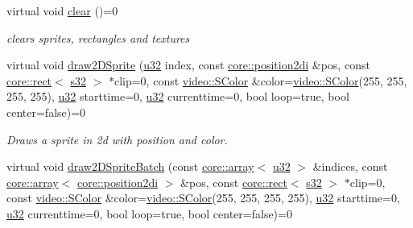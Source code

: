 \begin{DoxyCompactItemize}
virtual void \hyperlink{classirr_1_1gui_1_1IGUISpriteBank_a2305053e90c03ff274b637be23a5dd2a}{clear} ()=0
\begin{DoxyCompactList}\small\item\em clears sprites, rectangles and textures \end{DoxyCompactList}\item 
\mbox{\label{classirr_1_1gui_1_1IGUISpriteBank_aec335112ba4347aa50c5082e26fe2e9a}} 
virtual void \hyperlink{classirr_1_1gui_1_1IGUISpriteBank_aec335112ba4347aa50c5082e26fe2e9a}{draw2\+D\+Sprite} (\hyperlink{namespaceirr_a0416a53257075833e7002efd0a18e804}{u32} index, const \hyperlink{namespaceirr_1_1core_ace0f1379db5f9f5660456ec57ab78202}{core\+::position2di} \&pos, const \hyperlink{classirr_1_1core_1_1rect}{core\+::rect}$<$ \hyperlink{namespaceirr_ac66849b7a6ed16e30ebede579f9b47c6}{s32} $>$ $\ast$clip=0, const \hyperlink{classirr_1_1video_1_1SColor}{video\+::\+S\+Color} \&color=\hyperlink{classirr_1_1video_1_1SColor}{video\+::\+S\+Color}(255, 255, 255, 255), \hyperlink{namespaceirr_a0416a53257075833e7002efd0a18e804}{u32} starttime=0, \hyperlink{namespaceirr_a0416a53257075833e7002efd0a18e804}{u32} currenttime=0, bool loop=true, bool center=false)=0
\begin{DoxyCompactList}\small\item\em Draws a sprite in 2d with position and color. \end{DoxyCompactList}\item 
\mbox{\label{classirr_1_1gui_1_1IGUISpriteBank_adbfa01705a000248ea92149ad5e975d4}} 
virtual void \hyperlink{classirr_1_1gui_1_1IGUISpriteBank_adbfa01705a000248ea92149ad5e975d4}{draw2\+D\+Sprite\+Batch} (const \hyperlink{classirr_1_1core_1_1array}{core\+::array}$<$ \hyperlink{namespaceirr_a0416a53257075833e7002efd0a18e804}{u32} $>$ \&indices, const \hyperlink{classirr_1_1core_1_1array}{core\+::array}$<$ \hyperlink{namespaceirr_1_1core_ace0f1379db5f9f5660456ec57ab78202}{core\+::position2di} $>$ \&pos, const \hyperlink{classirr_1_1core_1_1rect}{core\+::rect}$<$ \hyperlink{namespaceirr_ac66849b7a6ed16e30ebede579f9b47c6}{s32} $>$ $\ast$clip=0, const \hyperlink{classirr_1_1video_1_1SColor}{video\+::\+S\+Color} \&color=\hyperlink{classirr_1_1video_1_1SColor}{video\+::\+S\+Color}(255, 255, 255, 255), \hyperlink{namespaceirr_a0416a53257075833e7002efd0a18e804}{u32} starttime=0, \hyperlink{namespaceirr_a0416a53257075833e7002efd0a18e804}{u32} currenttime=0, bool loop=true, bool center=false)=0

\end{DoxyCompactItemize}
